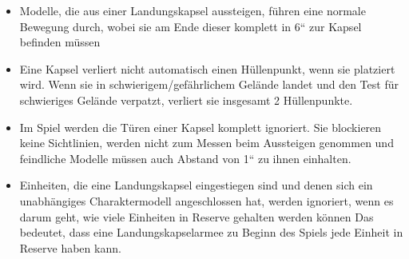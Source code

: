 \begin{itemize}

 \item Modelle, die aus einer Landungskapsel aussteigen, führen eine normale
  Bewegung durch, wobei sie am Ende dieser komplett in 6“ zur Kapsel befinden
  müssen

 \item Eine Kapsel verliert nicht automatisch einen Hüllenpunkt, wenn sie
  platziert wird. Wenn sie in schwierigem/gefährlichem Gelände landet und den
  Test für schwieriges Gelände verpatzt, verliert sie insgesamt 2 Hüllenpunkte.

 \item Im Spiel werden die Türen einer Kapsel komplett ignoriert. Sie blockieren
  keine Sichtlinien, werden nicht zum Messen beim Aussteigen genommen und
  feindliche Modelle müssen auch Abstand von 1“ zu ihnen einhalten.

 \item Einheiten, die eine Landungskapsel eingestiegen sind und denen sich ein
  unabhängiges Charaktermodell angeschlossen hat, werden ignoriert, wenn es
  darum geht, wie viele Einheiten in Reserve gehalten werden können
Das bedeutet, dass eine Landungskapselarmee zu Beginn des Spiels jede Einheit in
Reserve haben kann.

\end{itemize}

